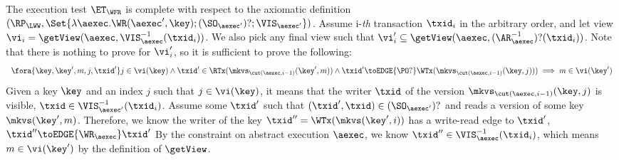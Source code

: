 The execution test $\ET_\WFR$ is complete with respect to the axiomatic definition 
\( (\RP_{\LWW}, \Set{\lambda \aexec. \WR(\aexec', \key) ; (\SO_{\aexec'})? ; \VIS_{\aexec'} })\).
Assume i-\emph{th} transaction \( \txid_i \) in the arbitrary order,
and let view \( \vi_{i} = \getView(\aexec, \VIS^{-1}_{\aexec}(\txid_{i}) ) \).
We also pick any final view such that \( \vi'_{i} \subseteq \getView(\aexec, (\AR^{-1}_{\aexec})?(\txid_{i}) ) \).
Note that there is nothing to prove for \( \vi'_i \),
so it is sufficient to prove the following:
\[
    \begin{array}{l}
    \fora{\key, \key', m, j, \txid'} j \in \vi(\key)
    \land \txid' \in \RTx(\mkvs_{\cut(\aexec, i-1)}(\key', m)) \land \txid' {\toEDGE{\PO?}} \WTx(\mkvs_{\cut(\aexec, i-1)}(\key, j)) ) 
    \implies m \in \vi(\key')
    \end{array}
\]
Given a key \( \key \) and an index \( j \) such that \( j \in \vi(\key) \), 
it means that the writer \( \txid \) of the version \( \mkvs_{\cut(\aexec, i-1)}(\key, j) \) is visible, \ie \( \txid \in \VIS_{\aexec'}^{-1}(\txid_i) \).
Assume some \( \txid' \) such that \( (\txid', \txid) \in (\SO_{\aexec'})? \) and reads a version of some key \( \mkvs(\key',m) \).
Therefore, we know the writer of the key \( \txid'' = \WTx(\mkvs(\key',i)) \) has a write-read edge to \( \txid' \), \ie \( \txid'' \toEDGE{\WR_\aexec} \txid'\) 
By the constraint on abstract execution \( \aexec \), we know \( \txid'' \in \VIS^{-1}_{\aexec}(\txid_{i}) \),
which means \( m \in \vi(\key')\) by the definition of \( \getView \).
